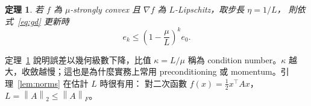 \documentclass[11pt]{ctexart}
\newtheorem{theorem}{定理}[section]
\theoremstyle{definition}
\newcommand{\norm}[1]{\left\lVert #1 \right\rVert}
\begin{document}
\begin{theorem}\label{thm:linear}
若 $f$ 為 $\mu$-strongly convex 且 $\nabla f$ 為 $L$-Lipschitz，取步長 $\eta = 1/L$，
則依式~\eqref{eq:gd} 更新時
\begin{equation}
  e_{k} \le \left(1 - \frac{\mu}{L}\right)^{k} e_0 .
\end{equation}
\end{theorem}

定理~\ref{thm:linear} 說明誤差以幾何級數下降，比值 $\kappa = L/\mu$ 稱為
condition number。$\kappa$ 越大，收斂越慢；這也是為什麼實務上常用
preconditioning 或 momentum。引理~\ref{lem:norms} 在估計 $L$ 時很有用：
對二次函數 $f(x) = \frac12 x^\top A x$，$L = \norm{A}_2 \le \norm{A}_F$。
\end{document}
